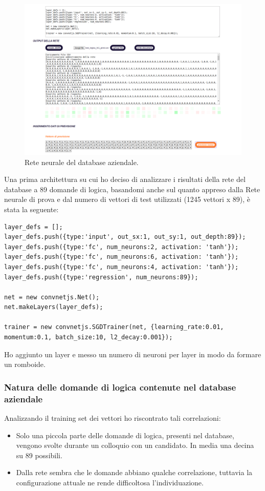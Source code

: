 \begin{figure}[H]
\centering
	\includegraphics[width=0.90\linewidth]{./image/rete_db.png}
	\caption{Rete neurale del database aziendale.}
	\label{Rete neurale del database aziendale.}
\end{figure}
\noindent
Una prima architettura su cui ho deciso di analizzare i risultati della rete del database a 89 domande di logica, basandomi anche sul quanto appreso dalla Rete neurale di prova e dal numero di vettori di test utilizzati (1245 vettori x 89), \`e stata la seguente:
\begin{verbatim}
layer_defs = [];
layer_defs.push({type:'input', out_sx:1, out_sy:1, out_depth:89});
layer_defs.push({type:'fc', num_neurons:2, activation: 'tanh'});
layer_defs.push({type:'fc', num_neurons:6, activation: 'tanh'});
layer_defs.push({type:'fc', num_neurons:4, activation: 'tanh'});
layer_defs.push({type:'regression', num_neurons:89});

net = new convnetjs.Net();
net.makeLayers(layer_defs);

trainer = new convnetjs.SGDTrainer(net, {learning_rate:0.01,
momentum:0.1, batch_size:10, l2_decay:0.001});
\end{verbatim}
Ho aggiunto un layer e messo un numero di neuroni per layer in modo da formare un romboide.

\subsubsection{Natura delle domande di logica contenute nel database aziendale}
\label{Natura delle domande di logica contenute nel database aziendale}

Analizzando il training set dei vettori ho riscontrato tali correlazioni:
\begin{itemize}
\item Solo una piccola parte delle domande di logica, presenti nel database, vengono svolte durante un colloquio con un candidato. In media una decina su 89 possibili.
\item Dalla rete sembra che le domande abbiano qualche correlazione, tuttavia la configurazione attuale ne rende difficoltosa l'individuazione.
\end{itemize}


